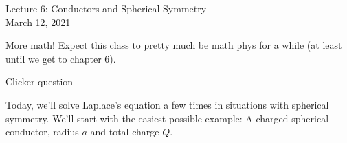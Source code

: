 \documentclass{article}
\begin{document}
\begin{center}
    {\Huge Lecture 6: Conductors and Spherical Symmetry} \\[0.5cm]
    {\Large March 12, 2021}
\end{center}

\vspace{1cm}

More math! Expect this class to pretty much be math phys for a while (at least until we get to chapter 6).

\begin{mdframed}[backgroundcolor=black!4, align=center, userdefinedwidth=0.8\textwidth, topline=false, bottomline=false, leftline=false, rightline=false, frametitle={Interlude}]

\begin{center}
    \iclicker[scale=0.28]Clicker question
\end{center}

\end{mdframed}

Today, we'll solve Laplace's equation a few times in situations with spherical symmetry. We'll start with the easiest possible example: A charged spherical conductor, radius $a$ and total charge $Q$.
\end{document}
